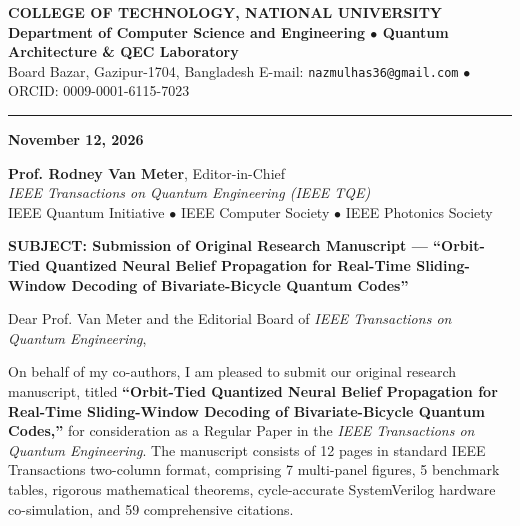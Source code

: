 \documentclass[11pt,a4paper]{article}
\begin{document}
\noindent
{\color{ieeeblue}\Large\textbf{COLLEGE OF TECHNOLOGY, NATIONAL UNIVERSITY}}\\[2pt]
\textbf{Department of Computer Science and Engineering $\bullet$ Quantum Architecture \& QEC Laboratory}\\[2pt]
Board Bazar, Gazipur-1704, Bangladesh \hfill E-mail: \texttt{nazmulhas36@gmail.com} $\bullet$ ORCID: 0009-0001-6115-7023\\
\rule{\linewidth}{1.5pt}

\vspace{0.8cm}

\noindent
\textbf{November 12, 2026}

\vspace{0.5cm}

\noindent
\textbf{Prof. Rodney Van Meter}, Editor-in-Chief\\
\textit{IEEE Transactions on Quantum Engineering (IEEE TQE)}\\
IEEE Quantum Initiative $\bullet$ IEEE Computer Society $\bullet$ IEEE Photonics Society

\vspace{0.6cm}

\noindent
\textbf{\color{ieeeblue}SUBJECT: Submission of Original Research Manuscript --- ``Orbit-Tied Quantized Neural Belief Propagation for Real-Time Sliding-Window Decoding of Bivariate-Bicycle Quantum Codes''}

\vspace{0.5cm}

\noindent
Dear Prof. Van Meter and the Editorial Board of \textit{IEEE Transactions on Quantum Engineering},

\vspace{0.3cm}

\noindent
On behalf of my co-authors, I am pleased to submit our original research manuscript, titled \textbf{``Orbit-Tied Quantized Neural Belief Propagation for Real-Time Sliding-Window Decoding of Bivariate-Bicycle Quantum Codes,''} for consideration as a Regular Paper in the \textit{IEEE Transactions on Quantum Engineering}. The manuscript consists of 12 pages in standard IEEE Transactions two-column format, comprising 7 multi-panel figures, 5 benchmark tables, rigorous mathematical theorems, cycle-accurate SystemVerilog hardware co-simulation, and 59 comprehensive citations.

\vspace{0.3cm}
\end{document}
